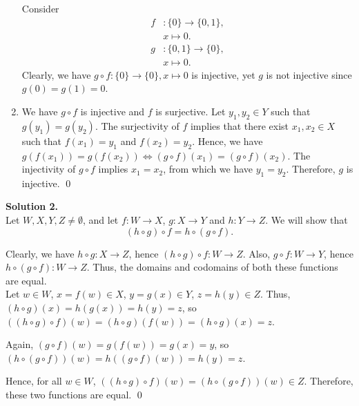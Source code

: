 \documentclass[10pt]{article}
\begin{document}
\begin{enumerate}
		Consider
		\begin{align*}
			f &: \{0\}  \to \{0, 1\},\\
			&x \mapsto 0.\\
			g &: \{0, 1\} \to \{0\},\\
			&x \mapsto 0.
		\end{align*}
		Clearly, we have $g\circ f: \{0\} \to \{0\}, x\mapsto 0$ is injective, yet $g$ is not injective since 
		$g(0) = g(1) = 0$.
		
		\item We have $g\circ f$ is injective and $f$ is surjective.
		Let $y_1, y_2 \in Y$ such that $g(y_1) = g(y_2)$. The surjectivity of $f$ implies that there exist $x_1, x_2 \in X$
		such that $f(x_1) = y_1$ and $f(x_2) = y_2$. Hence, we have $g(f(x_1)) = g(f(x_2)) \Leftrightarrow (g\circ f)(x_1) = (g\circ f)(x_2)$.
		The injectivity of $g\circ f$ implies $x_1 = x_2$, from which we have $y_1 = y_2$.
		Therefore, $g$ is injective. \qed
	\end{enumerate}
	
	\textbf{Solution 2.}\\ 
	Let $W, X, Y, Z \neq \emptyset$, and let $f: W\to X$, $g: X\to Y$ and $h: Y\to Z$. We will show that $$(h\circ g)\circ f = h\circ (g\circ f).$$
	
	Clearly, we have $h\circ g: X \to Z$, hence $(h \circ g)\circ f: W \to Z$. Also, $g\circ f: W\to Y$, hence $h\circ (g\circ f): W \to Z$.
	Thus, the domains and codomains of both these functions are equal.\\
	
	Let $w \in W$, $x = f(w) \in X$, $y = g(x) \in Y$, $z = h(y) \in Z$. Thus, $(h\circ g)(x) = h(g(x)) = h(y) = z$, so 
	$((h\circ g)\circ f)(w) = (h\circ g)(f(w)) = (h\circ g)(x) = z$.
	
	Again, $(g\circ f)(w) = g(f(w)) = g(x) = y$, so $(h \circ (g\circ f))(w) = h((g\circ f)(w)) = h(y) = z$.
	
	Hence, for all $w \in W$, $((h\circ g)\circ f)(w) = (h\circ (g\circ f))(w) \in Z$.
	Therefore, these two functions are equal. \qed\\
	
\end{document}
